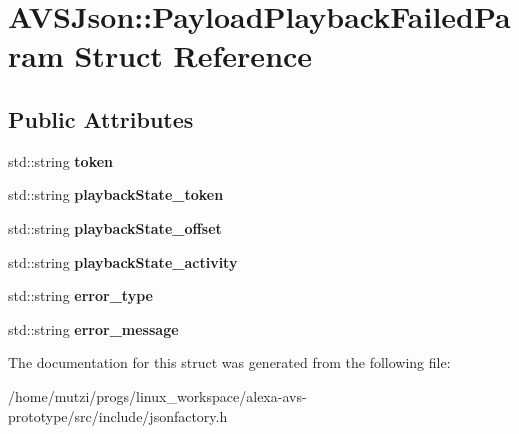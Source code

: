 \hypertarget{structAVSJson_1_1PayloadPlaybackFailedParam}{}\section{A\+V\+S\+Json\+:\+:Payload\+Playback\+Failed\+Param Struct Reference}
\label{structAVSJson_1_1PayloadPlaybackFailedParam}
\subsection*{Public Attributes}
\begin{DoxyCompactItemize}
\item 
\mbox{\label{structAVSJson_1_1PayloadPlaybackFailedParam_a3f603f32f98f057205411db2cf56ded9}} 
std\+::string {\bfseries token}
\item 
\mbox{\label{structAVSJson_1_1PayloadPlaybackFailedParam_a7303b1ac14d549ca2fd7399b32a5a847}} 
std\+::string {\bfseries playback\+State\+\_\+token}
\item 
\mbox{\label{structAVSJson_1_1PayloadPlaybackFailedParam_ac0ec827453cece0c09acb19570582ad1}} 
std\+::string {\bfseries playback\+State\+\_\+offset}
\item 
\mbox{\label{structAVSJson_1_1PayloadPlaybackFailedParam_aa0d01b525dd88b6e346c5e794283399a}} 
std\+::string {\bfseries playback\+State\+\_\+activity}
\item 
\mbox{\label{structAVSJson_1_1PayloadPlaybackFailedParam_a33c6b6474d7219fa6e3ec0aae2877396}} 
std\+::string {\bfseries error\+\_\+type}
\item 
\mbox{\label{structAVSJson_1_1PayloadPlaybackFailedParam_aeb11c1f814e512755adf89a169ebec6b}} 
std\+::string {\bfseries error\+\_\+message}
\end{DoxyCompactItemize}


The documentation for this struct was generated from the following file\+:\begin{DoxyCompactItemize}
\item 
/home/mutzi/progs/linux\+\_\+workspace/alexa-\/avs-\/prototype/src/include/jsonfactory.\+h\end{DoxyCompactItemize}
